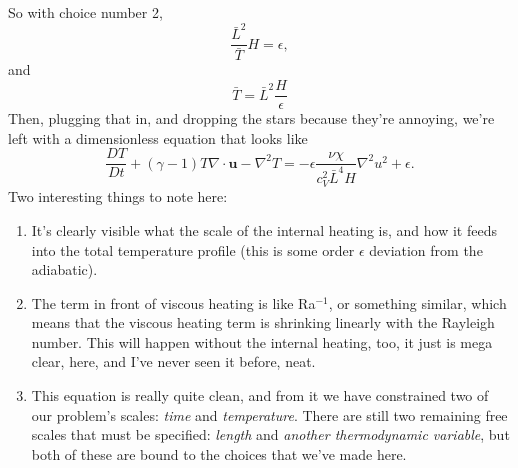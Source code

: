 \documentclass[aps, pre, onecolumn, nofootinbib, notitlepage, groupedaddress, amsfonts, amssymb, amsmath, longbibliography]{revtex4-1}
\newcommand{\grad}{\ensuremath{\nabla}}
\begin{document}
So with choice number 2,
$$
\frac{\bar{L}^2}{\bar{T}} H  = \epsilon,
$$
and
$$
\bar{T} = \bar{L}^2 \frac{H}{\epsilon}
$$
Then, plugging that in, and dropping the stars because they're annoying, we're left with
a dimensionless equation that looks like
\begin{equation}
\boxed{
\frac{D T}{D t} + (\gamma - 1) T \grad\cdot\bm{u} - \grad^2 T 
= -\epsilon \frac{\nu\chi}{c_V^2 \bar{L}^4 H} \grad^2 u^2 + \epsilon}.
\end{equation}
Two interesting things to note here:
\begin{enumerate}
\item It's clearly visible what the scale of the internal heating is, and how it feeds into
the total temperature profile (this is some order $\epsilon$ deviation from the adiabatic).
\item The term in front of viscous heating is like Ra$^{-1}$, or something similar, which
means that the viscous heating term is shrinking linearly with the Rayleigh number.  This
will happen without the internal heating, too, it just is mega clear, here, and I've never
seen it before, neat.
\item This equation is really quite clean, and from it we have constrained two of our problem's
scales: \emph{time} and \emph{temperature}.  There are still two remaining free scales that
must be specified: \emph{length} and \emph{another thermodynamic variable}, but both of
these are bound to the choices that we've made here.
\end{enumerate}
\end{document}
